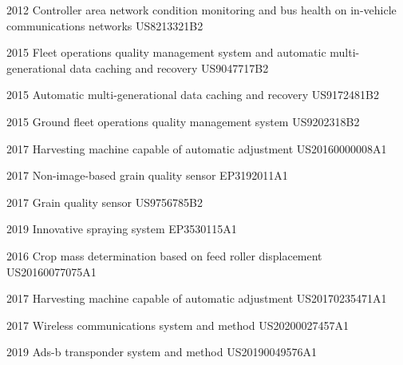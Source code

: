 

\begin{cvpatents}

  \cvpatent
    {2012} %
    {Controller area network condition monitoring and bus health on in-vehicle communications networks} %
    {US8213321B2} %

  \cvpatent
    {2015} %
    {Fleet operations quality management system and automatic multi-generational data caching and recovery} %
    {US9047717B2} %

  \cvpatent
    {2015} %
    {Automatic multi-generational data caching and recovery} %
    {US9172481B2} %

  \cvpatent
    {2015} %
    {Ground fleet operations quality management system} %
    {US9202318B2} %

  \cvpatent
    {2017} %
    {Harvesting machine capable of automatic adjustment} %
    {US20160000008A1} %

  \cvpatent
    {2017} %
    {Non-image-based grain quality sensor} %
    {EP3192011A1} %

  \cvpatent
    {2017} %
    {Grain quality sensor} %
    {US9756785B2} %

  \cvpatent
    {2019} %
    {Innovative spraying system} %
    {EP3530115A1} %

  \cvpatent
    {2016} %
    {Crop mass determination based on feed roller displacement} %
    {US20160077075A1} %

  \cvpatent
    {2017} %
    {Harvesting machine capable of automatic adjustment} %
    {US20170235471A1} %

  \cvpatent
    {2017} %
    {Wireless communications system and method} %
    {US20200027457A1} %

  \cvpatent
    {2019} %
    {Ads-b transponder system and method} %
    {US20190049576A1} %

\end{cvpatents}

